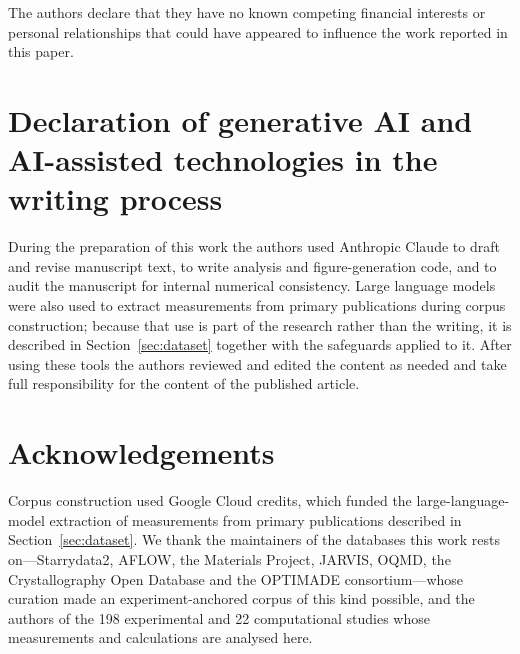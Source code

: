 \documentclass[final,5p,times,twocolumn]{elsarticle}
\newcommand{\acknowledgementtext}{%
  Corpus construction used Google Cloud credits, which funded the large-language-model extraction
  of measurements from primary publications described in Section~\ref{sec:dataset}. We thank the
  maintainers of the databases this work rests on---Starrydata2, AFLOW, the Materials Project,
  JARVIS, OQMD, the Crystallography Open Database and the OPTIMADE consortium---whose curation
  made an experiment-anchored corpus of this kind possible, and the authors of the \num{198}
  experimental and \num{22} computational studies whose measurements and calculations are analysed
  here.}
\begin{document}
The authors declare that they have no known competing financial interests or personal relationships
that could have appeared to influence the work reported in this paper.

\section*{Declaration of generative AI and AI-assisted technologies in the writing process}

During the preparation of this work the authors used Anthropic Claude to draft and revise
manuscript text, to write analysis and figure-generation code, and to audit the manuscript for
internal numerical consistency. Large language models were also used to extract measurements from
primary publications during corpus construction; because that use is part of the research rather
than the writing, it is described in Section~\ref{sec:dataset} together with the safeguards applied
to it. After using these tools the authors reviewed and edited the content as needed and take full
responsibility for the content of the published article.

\section*{Acknowledgements}

\acknowledgementtext



\end{document}
